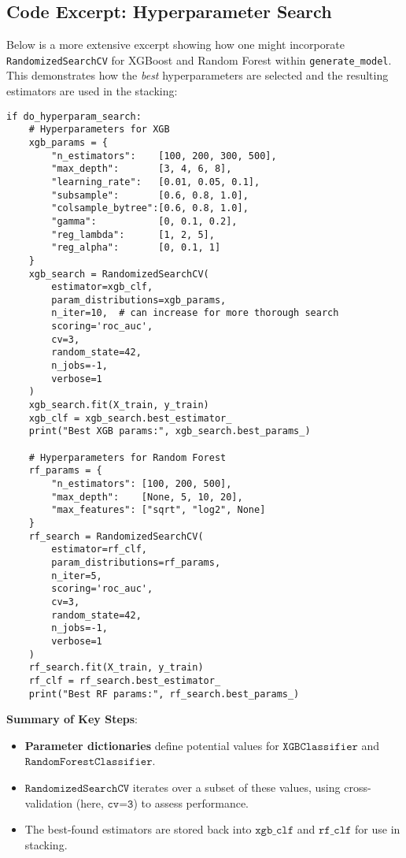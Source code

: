 \documentclass[12pt]{article}
\begin{document}
\subsection{Code Excerpt: Hyperparameter Search}
Below is a more extensive excerpt showing how one might incorporate \texttt{RandomizedSearchCV} for XGBoost and Random Forest within \texttt{generate\_model}. This demonstrates how the \emph{best} hyperparameters are selected and the resulting estimators are used in the stacking:

\begin{verbatim}
if do_hyperparam_search:
    # Hyperparameters for XGB
    xgb_params = {
        "n_estimators":    [100, 200, 300, 500],
        "max_depth":       [3, 4, 6, 8],
        "learning_rate":   [0.01, 0.05, 0.1],
        "subsample":       [0.6, 0.8, 1.0],
        "colsample_bytree":[0.6, 0.8, 1.0],
        "gamma":           [0, 0.1, 0.2],
        "reg_lambda":      [1, 2, 5],
        "reg_alpha":       [0, 0.1, 1]
    }
    xgb_search = RandomizedSearchCV(
        estimator=xgb_clf,
        param_distributions=xgb_params,
        n_iter=10,  # can increase for more thorough search
        scoring='roc_auc',
        cv=3,
        random_state=42,
        n_jobs=-1,
        verbose=1
    )
    xgb_search.fit(X_train, y_train)
    xgb_clf = xgb_search.best_estimator_
    print("Best XGB params:", xgb_search.best_params_)

    # Hyperparameters for Random Forest
    rf_params = {
        "n_estimators": [100, 200, 500],
        "max_depth":    [None, 5, 10, 20],
        "max_features": ["sqrt", "log2", None]
    }
    rf_search = RandomizedSearchCV(
        estimator=rf_clf,
        param_distributions=rf_params,
        n_iter=5,
        scoring='roc_auc',
        cv=3,
        random_state=42,
        n_jobs=-1,
        verbose=1
    )
    rf_search.fit(X_train, y_train)
    rf_clf = rf_search.best_estimator_
    print("Best RF params:", rf_search.best_params_)
\end{verbatim}

\noindent
\textbf{Summary of Key Steps}:
\begin{itemize}
    \item \textbf{Parameter dictionaries} define potential values for \(\texttt{XGBClassifier}\) and \(\texttt{RandomForestClassifier}\).
    \item \(\texttt{RandomizedSearchCV}\) iterates over a subset of these values, using cross-validation (here, \(\texttt{cv=3}\)) to assess performance.
    \item The best-found estimators are stored back into \(\texttt{xgb\_clf}\) and \(\texttt{rf\_clf}\) for use in stacking.
\end{itemize}
\end{document}
